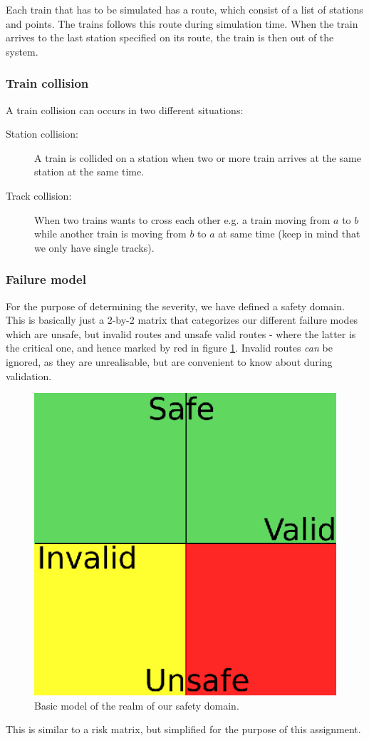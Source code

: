 \documentclass[10pt,a4paper]{article}
\begin{document}
Each train that has to be simulated has a route, which consist of a list of stations and points. The trains follows this route during simulation time. When the train arrives to the last station specified on its route, the train is then out of the system.
 
\subsubsection{Train collision}
 
A train collision can occurs in two different situations:

\begin{description}

\item[Station collision:]
A train is collided on a station when two or more train arrives at the same station at the same time.
\item[Track collision:]
When two trains wants to cross each other e.g. a train moving from $a$ to $b$ while another train is moving from $b$ to $a$ at same time (keep in mind that we only have single tracks).
\end{description}

\subsubsection{Failure model}
For the purpose of determining the severity, we have defined a safety domain. This is basically just a 2-by-2 matrix that categorizes our different failure modes which are unsafe, but invalid routes and unsafe valid routes - where the latter is the critical one, and hence marked by red in figure \ref{fig:safety_domain}. Invalid routes \emph{can} be ignored, as they are unrealisable, but are convenient to know about during validation.

\begin{figure}[h]
\centering
\includegraphics[scale=0.5]{fig/Safety_domains.eps}
 \caption{Basic model of the realm of our safety domain.}
 \label{fig:safety_domain}
\end{figure}
This is similar to a risk matrix, but simplified for the purpose of this assignment.
\end{document}
